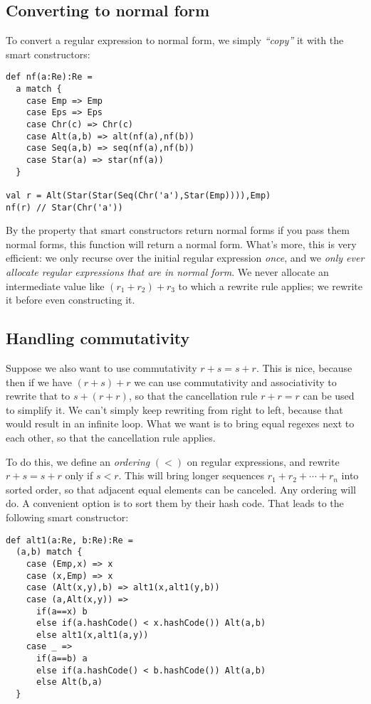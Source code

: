 \documentclass[a4paper, 11pt]{article}
\theoremstyle{definition}
\begin{document}
\subsection{Converting to normal form}

To convert a regular expression to normal form, we simply \emph{``copy''} it with the smart constructors:

\begin{lstlisting}
def nf(a:Re):Re =
  a match {
    case Emp => Emp
    case Eps => Eps
    case Chr(c) => Chr(c)
    case Alt(a,b) => alt(nf(a),nf(b))
    case Seq(a,b) => seq(nf(a),nf(b))
    case Star(a) => star(nf(a))
  }

val r = Alt(Star(Star(Seq(Chr('a'),Star(Emp)))),Emp)
nf(r) // Star(Chr('a'))
\end{lstlisting}

By the property that smart constructors return normal forms if you pass them normal forms, this function will return a normal form. What's more, this is very efficient: we only recurse over the initial regular expression \emph{once}, and we \emph{only ever allocate regular expressions that are in normal form}. We never allocate an intermediate value like $(r_1 + r_2) + r_3$ to which a rewrite rule applies; we rewrite it before even constructing it.

\subsection{Handling commutativity}

Suppose we also want to use commutativity $r + s = s + r$. This is nice, because then if we have $(r + s) + r$ we can use commutativity and associativity to rewrite that to $s + (r + r)$, so that the cancellation rule $r + r = r$ can be used to simplify it. We can't simply keep rewriting from right to left, because that would result in an infinite loop. What we want is to bring equal regexes next to each other, so that the cancellation rule applies.

To do this, we define an \emph{ordering} $(<)$ on regular expressions, and rewrite $r + s = s + r$ only if $s < r$. This will bring longer sequences $r_1 + r_2 + \cdots + r_n$ into sorted order, so that adjacent equal elements can be canceled. Any ordering will do. A convenient option is to sort them by their hash code. That leads to the following smart constructor:

\begin{lstlisting}
def alt1(a:Re, b:Re):Re =
  (a,b) match {
    case (Emp,x) => x
    case (x,Emp) => x
    case (Alt(x,y),b) => alt1(x,alt1(y,b))
    case (a,Alt(x,y)) =>
      if(a==x) b
      else if(a.hashCode() < x.hashCode()) Alt(a,b)
      else alt1(x,alt1(a,y))
    case _ =>
      if(a==b) a
      else if(a.hashCode() < b.hashCode()) Alt(a,b)
      else Alt(b,a)
  }
\end{lstlisting}
\end{document}
